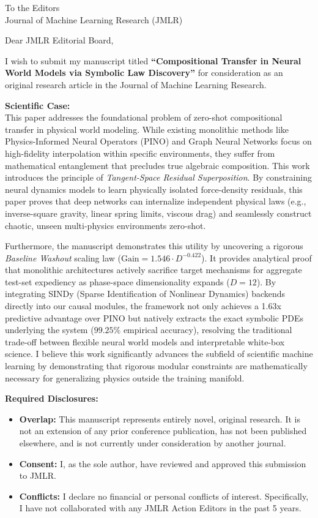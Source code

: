 \documentclass[11pt]{letter}
\begin{document}
\begin{letter}{To the Editors \\ Journal of Machine Learning Research (JMLR)}

\opening{Dear JMLR Editorial Board,}

I wish to submit my manuscript titled \textbf{``Compositional Transfer in Neural World Models via Symbolic Law Discovery''} for consideration as an original research article in the Journal of Machine Learning Research.

\textbf{Scientific Case:}\\
This paper addresses the foundational problem of zero-shot compositional transfer in physical world modeling. While existing monolithic methods like Physics-Informed Neural Operators (PINO) and Graph Neural Networks focus on high-fidelity interpolation within specific environments, they suffer from mathematical entanglement that precludes true algebraic composition. This work introduces the principle of \emph{Tangent-Space Residual Superposition}. By constraining neural dynamics models to learn physically isolated force-density residuals, this paper proves that deep networks can internalize independent physical laws (e.g., inverse-square gravity, linear spring limits, viscous drag) and seamlessly construct chaotic, unseen multi-physics environments zero-shot.

Furthermore, the manuscript demonstrates this utility by uncovering a rigorous \emph{Baseline Washout} scaling law ($\text{Gain} = 1.546 \cdot D^{-0.422}$). It provides analytical proof that monolithic architectures actively sacrifice target mechanisms for aggregate test-set expediency as phase-space dimensionality expands ($D=12$). By integrating SINDy (Sparse Identification of Nonlinear Dynamics) backends directly into our causal modules, the framework not only achieves a 1.63x predictive advantage over PINO but natively extracts the exact symbolic PDEs underlying the system ($99.25\%$ empirical accuracy), resolving the traditional trade-off between flexible neural world models and interpretable white-box science. I believe this work significantly advances the subfield of scientific machine learning by demonstrating that rigorous modular constraints are mathematically necessary for generalizing physics outside the training manifold.

\textbf{Required Disclosures:}
\begin{itemize}
    \item \textbf{Overlap:} This manuscript represents entirely novel, original research. It is not an extension of any prior conference publication, has not been published elsewhere, and is not currently under consideration by another journal.
    \item \textbf{Consent:} I, as the sole author, have reviewed and approved this submission to JMLR.
    \item \textbf{Conflicts:} I declare no financial or personal conflicts of interest. Specifically, I have not collaborated with any JMLR Action Editors in the past 5 years.
\end{itemize}


\end{letter}
\end{document}
